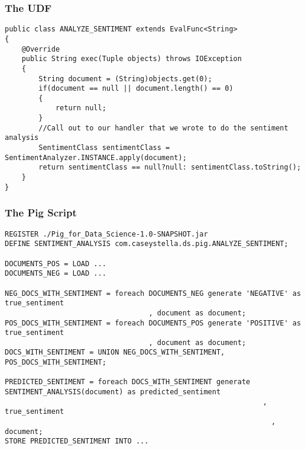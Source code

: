 \documentclass{beamer}
\begin{document}

\begin{frame}[fragile]
\frametitle{The UDF}
\lstset {
  basicstyle=\ttfamily\scriptsize,
  breaklines=true
}

\begin{lstlisting}
public class ANALYZE_SENTIMENT extends EvalFunc<String>
{
    @Override
    public String exec(Tuple objects) throws IOException
    {
        String document = (String)objects.get(0);
        if(document == null || document.length() == 0)
        {
            return null;
        }
        //Call out to our handler that we wrote to do the sentiment analysis
        SentimentClass sentimentClass = SentimentAnalyzer.INSTANCE.apply(document);
        return sentimentClass == null?null: sentimentClass.toString();
    }
}
\end{lstlisting}
\end{frame}

\begin{frame}[fragile]
\frametitle{The Pig Script}
\lstset {
  basicstyle=\ttfamily\scriptsize,
  breaklines=true
}
\begin{lstlisting}
REGISTER ./Pig_for_Data_Science-1.0-SNAPSHOT.jar
DEFINE SENTIMENT_ANALYSIS com.caseystella.ds.pig.ANALYZE_SENTIMENT;

DOCUMENTS_POS = LOAD ...
DOCUMENTS_NEG = LOAD ...

NEG_DOCS_WITH_SENTIMENT = foreach DOCUMENTS_NEG generate 'NEGATIVE' as true_sentiment
							      , document as document;
POS_DOCS_WITH_SENTIMENT = foreach DOCUMENTS_POS generate 'POSITIVE' as true_sentiment
							      , document as document;
DOCS_WITH_SENTIMENT = UNION NEG_DOCS_WITH_SENTIMENT, POS_DOCS_WITH_SENTIMENT;

PREDICTED_SENTIMENT = foreach DOCS_WITH_SENTIMENT generate SENTIMENT_ANALYSIS(document) as predicted_sentiment
                              						         , true_sentiment
						                                       , document;
STORE PREDICTED_SENTIMENT INTO ...
\end{lstlisting}
\end{frame}
\end{document}
